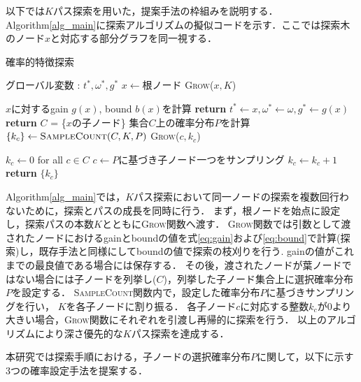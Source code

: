 以下では$K$パス探索を用いた，提案手法の枠組みを説明する．
Algorithm\ref{alg_main}に探索アルゴリズムの擬似コードを示す．ここでは探索木のノード$x$と対応する部分グラフを同一視する．
\begin{algorithm}
	\small 
	\caption{確率的特徴探索}\label{alg_main}
	\begin{algorithmic}[1]
		\State グローバル変数 : $t^*,\omega^*,g^*$
		\State $x \gets \text{根ノード}$ 
		\State \textsc{Grow}($x,K$)
		\EndProcedure

		\State $x$に対するgain $g(x)$, bound $b(x)$を計算
		\State \textbf{return}
		\EndIf
		\State $t^* \gets x,\omega^* \gets \omega,g^* \gets g(x)$
		\EndIf
		\State \textbf{return}
		\EndIf
		\State$C$ = \{$x$の子ノード\}
		\State 集合$C$上の確率分布$P$を計算 
		\State $\{k_c\} \gets \textsc{SampleCount}(C,K,P)$
		\State \textsc{Grow}($c,k_c$)
		\EndIf
		\EndFor
		\EndFunction

		\State $k_c \gets 0$ for all $c \in C$ 
		\State $c \gets \text{$P$に基づき子ノード一つをサンプリング} $
		\State $k_c \gets k_c + 1$
		\EndFor
		\State \textbf{return} $\{k_c\}$
		\EndFunction
	\end{algorithmic}
\end{algorithm}

Algorithm\ref{alg_main}では，$K$パス探索において同一ノードの探索を複数回行わないために，探索とパスの成長を同時に行う．
まず，根ノードを始点に設定し，探索パスの本数$K$とともに\textsc{Grow}関数へ渡す．
\textsc{Grow}関数では引数として渡されたノードにおけるgainとboundの値を式\eqref{eq:gain}および\eqref{eq:bound}で計算(探索)し，既存手法と同様にしてboundの値で探索の枝刈りを行う.
gainの値がこれまでの最良値である場合には保存する．
その後，渡されたノードが葉ノードではない場合には子ノードを列挙し($C$)，列挙した子ノード集合上に選択確率分布$P$を設定する．
\textsc{SampleCount}関数内で，設定した確率分布$P$に基づきサンプリングを行い， $K$を各子ノードに割り振る．
各子ノード$c$に対応する整数$k_c$が$0$より大きい場合，\textsc{Grow}関数にそれぞれを引渡し再帰的に探索を行う．
以上のアルゴリズムにより深さ優先的な$K$パス探索を達成する．

本研究では探索手順における，子ノードの選択確率分布$P$に関して，以下に示す3つの確率設定手法を提案する．

